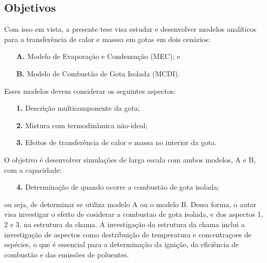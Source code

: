 \subsection{Objetivos}

Com isso em vista, a presente tese visa estudar e desenvolver modelos analíticos para a transferência de calor e masssa em gotas em dois cenários: 
\begin{enumerate}
    \item[\textbf{A.}] Modelo de Evaporaçào e Condensação (MEC); e 
    \item[\textbf{B.}] Modelo de Combustão de Gota Isolada (MCDI).
\end{enumerate}
Esses modelos devem considerar os seguintes aspectos: 
\begin{enumerate}
    \item[\textbf{1.}] Descrição multicomponente da gota; 
    \item[\textbf{2.}] Mistura com termodinâmica não-ideal; 
    \item[\textbf{3.}] Efeitos de transferência	de calor e massa no interior da gota. 
\end{enumerate}
O objetivo é desenvolver simulações de larga escala com ambos modelos, {A} e {B}, com a capacidade:
\begin{enumerate}
    \item[\textbf{4.}] Determinação de quando ocorre a combustão de gota isolada;
\end{enumerate}
ou seja, de determinar se utiliza modelo {A} ou o modelo {B}.
Dessa forma, o autor visa investigar o efeito de cosiderar a combustao de gota isolada, e dos aspectos {1}, {2} e {3}, na estrutura da chama.
A investigação da estrutura da chama inclui a investigação de aspectos como destribuição de temperatura e concentraçoes de espécies, o que é essencial para a determinação da ignição, da eficiência de combustão e das emissões de poluentes.



